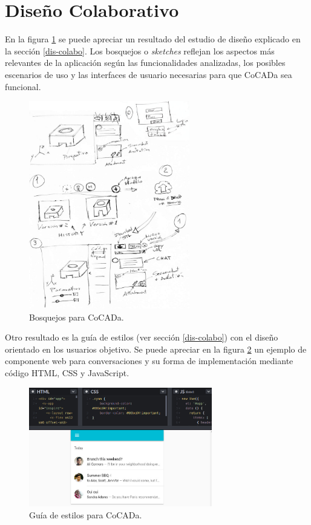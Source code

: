 \section{Diseño Colaborativo}
\label{dis-des-colabo}

En la figura \ref{salida} se puede apreciar un resultado del estudio de diseño explicado en la sección \ref{dis-colabo}. Los bosquejos o \textit{sketches} reflejan los aspectos más relevantes de la aplicación según las funcionalidades analizadas, los posibles escenarios de uso y las interfaces de usuario necesarias para que CoCADa sea funcional.
 
\begin{figure}[ht]
\includegraphics[width=7cm]{Img/UX/edc.jpg}
\centering
\caption{\footnotesize{Bosquejos para CoCADa.}}
\label{salida}
\end{figure}

Otro resultado es la guía de estilos (ver sección \ref{dis-colabo}) con el diseño orientado en los usuarios objetivo. Se puede apreciar en la figura \ref{vuetify} un ejemplo de componente web para conversaciones y su forma de implementación  mediante código \Gls{HTML}, CSS y \Gls{JavaScript}.

 

\begin{figure}[ht]
\includegraphics[width=8cm]{Img/Desarrollo/vuety.jpg}
\centering
\caption{\footnotesize{Guía de estilos para CoCADa. }}
\label{vuetify}
\end{figure}



